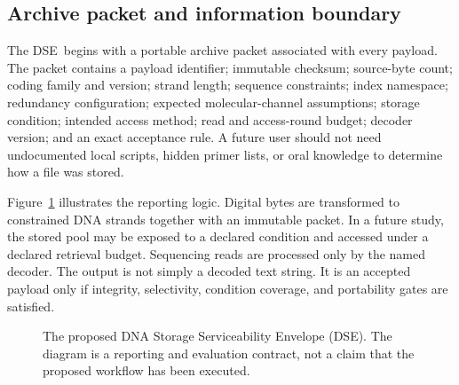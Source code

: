 \documentclass[conference]{IEEEtran}
\newcommand{\DSE}{\textsc{DSE}}
\begin{document}
\subsection{Archive packet and information boundary}

The \DSE\ begins with a portable archive packet associated with every payload. The packet contains a payload identifier; immutable checksum; source-byte count; coding family and version; strand length; sequence constraints; index namespace; redundancy configuration; expected molecular-channel assumptions; storage condition; intended access method; read and access-round budget; decoder version; and an exact acceptance rule. A future user should not need undocumented local scripts, hidden primer lists, or oral knowledge to determine how a file was stored.

Figure~\ref{fig:dse} illustrates the reporting logic. Digital bytes are transformed to constrained DNA strands together with an immutable packet. In a future study, the stored pool may be exposed to a declared condition and accessed under a declared retrieval budget. Sequencing reads are processed only by the named decoder. The output is not simply a decoded text string. It is an accepted payload only if integrity, selectivity, condition coverage, and portability gates are satisfied.

\begin{figure}[t]
\centering
{}
\caption{The proposed DNA Storage Serviceability Envelope (DSE). The diagram is a reporting and evaluation contract, not a claim that the proposed workflow has been executed.}
\label{fig:dse}
\end{figure}
\end{document}
